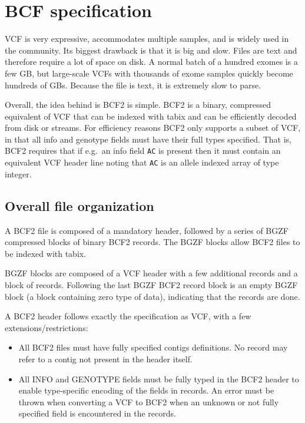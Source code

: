 \documentclass[8pt]{article}
\begin{document}
\pagebreak
\section{BCF specification}

VCF is very expressive, accommodates multiple samples, and is widely used in the community.
Its biggest drawback is that it is big and slow.
Files are text and therefore require a lot of space on disk.
A normal batch of a hundred exomes is a few GB, but large-scale VCFs with thousands of exome samples quickly become hundreds of GBs.
Because the file is text, it is extremely slow to parse.

Overall, the idea behind is BCF2 is simple.
BCF2 is a binary, compressed equivalent of VCF that can be indexed with tabix and can be efficiently decoded from disk or streams.
For efficiency reasons BCF2 only supports a subset of VCF, in that all info and genotype fields must have their full types specified.
That is, BCF2 requires that if e.g.\ an info field {\tt AC} is present then it must contain an equivalent VCF header line noting that {\tt AC} is an allele indexed array of type integer.

\subsection{Overall file organization}

A BCF2 file is composed of a mandatory header, followed by a series of BGZF compressed blocks of binary BCF2 records.
The BGZF blocks allow BCF2 files to be indexed with tabix.

BGZF blocks are composed of a VCF header with a few additional records and a block of records.
Following the last BGZF BCF2 record block is an empty BGZF block (a block containing zero type of data), indicating that the records are done.

A BCF2 header follows exactly the specification as VCF, with a few extensions/restrictions:
\begin{itemize}
  \item All BCF2 files must have fully specified contigs definitions.
  No record may refer to a contig not present in the header itself.

  \item All INFO and GENOTYPE fields must be fully typed in the BCF2 header to enable type-specific encoding of the fields in records.
  An error must be thrown when converting a VCF to BCF2 when an unknown or not fully specified field is encountered in the records.
\end{itemize}
\end{document}
